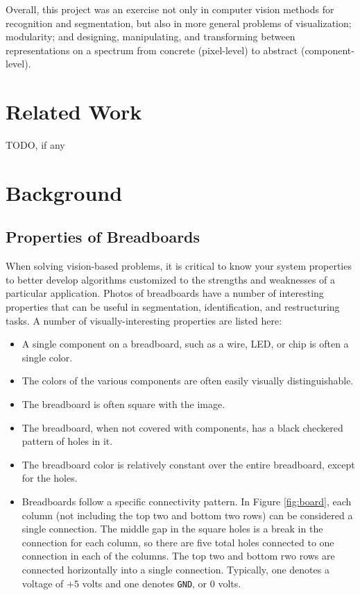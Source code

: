 \documentclass[10pt,twocolumn,letterpaper]{article}
\begin{document}
Overall, this project was an exercise not only in computer vision
methods for recognition and segmentation, but also in more general
problems of visualization; modularity; and designing, manipulating,
and transforming between representations on a spectrum from
concrete (pixel-level) to abstract (component-level).


\section{Related Work}

TODO, if any


\section{Background}

\subsection{Properties of Breadboards}

When solving vision-based problems, it is critical to know your system
properties to better develop algorithms customized to the strengths and
weaknesses of a particular application. Photos of breadboards have a number of
interesting properties that can be useful in segmentation, identification, and
restructuring tasks. A number of visually-interesting properties are listed here:
\begin{itemize}
\item A single component on a breadboard, such as a wire, LED, or chip is often a single color. 
\item The colors of the various components are often easily visually distinguishable. 
\item The breadboard is often square with the image. 
\item The breadboard, when not covered with components, has a black checkered pattern of holes in it. 
\item The breadboard color is relatively constant over the entire breadboard, except for the holes.
\item Breadboards follow a specific connectivity pattern. In Figure \ref{fig:board}, each column (not including the top two and bottom two rows) can be considered a single connection. The middle gap in the square holes is a break in the connection for each column, so there are five total holes connected to one connection in each of the columns. The top two and bottom rwo rows are connected horizontally into a single connection. Typically, one denotes a voltage of $+5$ volts and one denotes \verb|GND|, or $0$ volts. 
\end{itemize}
\end{document}
